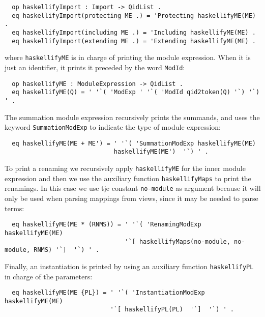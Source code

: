 {\codesize
\begin{verbatim}
  op haskellifyImport : Import -> QidList .
  eq haskellifyImport(protecting ME .) = 'Protecting haskellifyME(ME) .
  eq haskellifyImport(including ME .) = 'Including haskellifyME(ME) .
  eq haskellifyImport(extending ME .) = 'Extending haskellifyME(ME) .
\end{verbatim}
}

\noindent where \verb"haskellifyME" is in charge of printing the 
module expression. When it is just an identifier, it prints it 
preceded by the word \verb"ModId":

{\codesize
\begin{verbatim}
  op haskellifyME : ModuleExpression -> QidList .
  eq haskellifyME(Q) = ' '`( 'ModExp ' '`( 'ModId qid2token(Q) '`) '`) ' .
\end{verbatim}
}

The summation module expression recursively prints the summands, and uses
the keyword \verb"SummationModExp" to indicate the type of module expression:

{\codesize
\begin{verbatim}
  eq haskellifyME(ME + ME') = ' '`( 'SummationModExp haskellifyME(ME) 
                              haskellifyME(ME')  '`) ' .
\end{verbatim}
}

To print a renaming we recursively apply \verb"haskellifyME" for the inner
module expression and then we use the auxiliary function \verb"haskellifyMaps" to 
print the renamings. In this case we use tje constant \verb"no-module" as argument
because it will only be used when parsing mappings from views, since it may
be needed to parse terms:

{\codesize
\begin{verbatim}
  eq haskellifyME(ME * (RNMS)) = ' '`( 'RenamingModExp haskellifyME(ME) 
                                 '`[ haskellifyMaps(no-module, no-module, RNMS) '`]  '`) ' .
\end{verbatim}
}

Finally, an instantiation is printed by using an auxiliary function \verb"haskellifyPL"
in charge of the parameters:

{\codesize
\begin{verbatim}
  eq haskellifyME(ME {PL}) = ' '`( 'InstantiationModExp haskellifyME(ME) 
                             '`[ haskellifyPL(PL)  '`]  '`) ' .
\end{verbatim}
}
